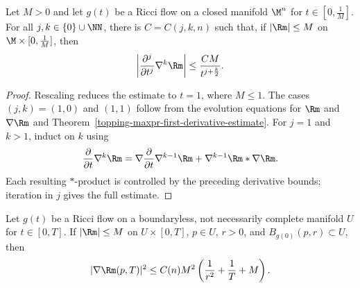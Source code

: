 \begin{corollary}
\label{topping-maxpr-higher-derivatives}

Let $M>0$ and let $g(t)$ be a Ricci flow on a closed manifold $\M^n$ for
$t\in[0,\frac1M]$. For all $j,k\in\{0\}\cup\NN$, there is
$C=C(j,k,n)$ such that, if $|\Rm|\leq M$ on
$\M\times[0,\frac1M]$, then
\[
\left|\frac{\partial^j}{\partial t^j}\nabla^k\Rm\right|
\leq\frac{CM}{t^{j+\frac{k}{2}}}.
\]
\end{corollary}

\begin{proof}
\sketch Rescaling reduces the estimate to $t=1$, where $M\leq1$. The cases
$(j,k)=(1,0)$ and $(1,1)$ follow from the evolution equations for $\Rm$ and
$\nabla\Rm$ and Theorem~\ref{topping-maxpr-first-derivative-estimate}. For $j=1$ and $k>1$, induct on $k$ using
\[
\frac{\partial}{\partial t}\nabla^k\Rm
=\nabla\frac{\partial}{\partial t}\nabla^{k-1}\Rm
 +\nabla^{k-1}\Rm*\nabla\Rm.
\]
Each resulting $*$-product is controlled by the preceding derivative bounds;
iteration in $j$ gives the full estimate.
\end{proof}

\begin{theorem}
\label{topping-maxpr-shi-estimate}
Let $g(t)$ be a Ricci flow on a boundaryless, not necessarily complete
manifold $U$ for $t\in[0,T]$. If $|\Rm|\leq M$ on $U\times[0,T]$, $p\in U$,
$r>0$, and $B_{g(0)}(p,r)\subset U$, then
\[
|\nabla\Rm(p,T)|^2\leq C(n)M^2
\left(\frac1{r^2}+\frac1T+M\right).
\]
\end{theorem}
